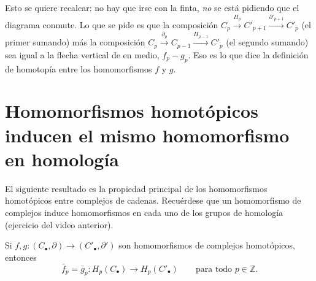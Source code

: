 \documentclass[11pt]{article}
\begin{document}
\begin{center}
\end{center}

Esto se quiere recalcar: no hay que irse con la finta, \emph{no} se está pidiendo que el diagrama conmute. Lo que se pide es que la composición $C_p\xrightarrow{H_p}C'_{p+1}\xrightarrow{\partial'_{p+1}}C'_p$ (el primer sumando) más la composición $C_p\xrightarrow{\partial_p}C_{p-1}\xrightarrow{H_{p-1}}C'_p$ (el segundo sumando) sea igual a la flecha vertical de en medio, $f_p-g_p$. Eso es lo que dice la definición de homotopía entre los homomorfismos $f$ y $g$.

\section*{Homomorfismos homotópicos inducen el mismo homomorfismo en homología}

El siguiente resultado es la propiedad principal de los homomorfismos homotópicos entre complejos de cadenas. Recuérdese que un homomorfismo de complejos induce homomorfismos en cada uno de los grupos de homología (ejercicio del video anterior).

\begin{lema}\label{lema:homotopicos-homologia}
Si $f,g\colon(C_\bullet,\partial)\to(C'_\bullet,\partial')$ son homomorfismos de complejos homotópicos, entonces
\[
  \bar f_p=\bar g_p\colon H_p(C_\bullet)\longrightarrow H_p(C'_\bullet)\qquad\text{para todo }p\in\mathbb Z.
\]
\end{lema}
\end{document}
